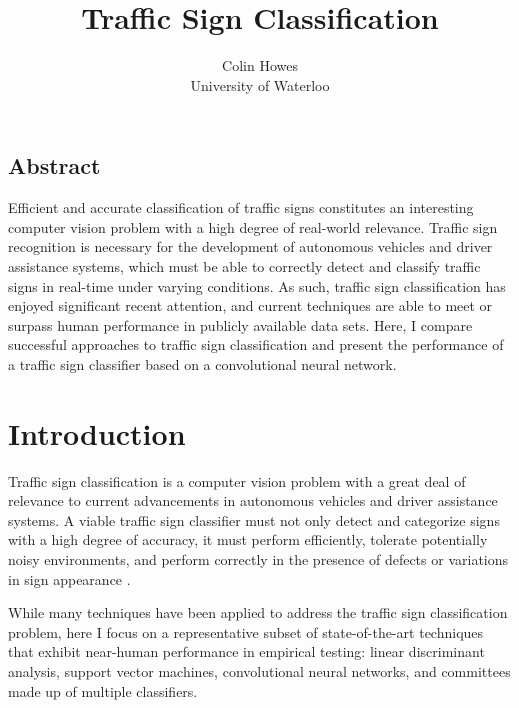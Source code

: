 \documentclass[letterpaper,twocolumn,10pt]{article}
\begin{document}
\date{}

\title{\Large \bf Traffic Sign Classification}

\author{
	{\rm Colin Howes}\\
	University of Waterloo
} %

\maketitle

\thispagestyle{empty}


\subsection*{Abstract}

Efficient and accurate classification of traffic signs constitutes an interesting computer vision problem with a high degree of real-world relevance. Traffic sign recognition is necessary for the development of autonomous vehicles and driver assistance systems, which must be able to correctly detect and classify traffic signs in real-time under varying conditions. As such, traffic sign classification has enjoyed significant recent attention, and current techniques are able to meet or surpass human performance in publicly available data sets. Here, I compare successful approaches to traffic sign classification and present the performance of a traffic sign classifier based on a convolutional neural network.


\section{Introduction}

Traffic sign classification is a computer vision problem with a great deal of relevance to current advancements in autonomous vehicles and driver assistance systems. A viable traffic sign classifier must not only detect and categorize signs with a high degree of accuracy, it must perform efficiently, tolerate potentially noisy environments, and perform correctly in the presence of defects or variations in sign appearance \cite{stallkamp_german_2011, stallkamp_man_2012}. 

While many techniques have been applied to address the traffic sign classification problem, here I focus on a representative subset of state-of-the-art techniques that exhibit near-human performance in empirical testing: linear discriminant analysis, support vector machines, convolutional neural networks, and committees made up of multiple classifiers.
\end{document}
